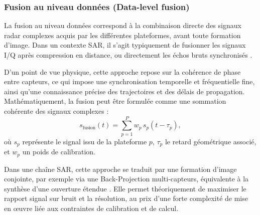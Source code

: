 \subsubsection{Fusion au niveau données (Data-level fusion)}

La fusion au niveau données correspond à la combinaison directe des signaux radar complexes acquis par les différentes plateformes, avant toute formation d’image.  
Dans un contexte SAR, il s’agit typiquement de fusionner les signaux I/Q après compression en distance, ou directement les échos bruts synchronisés \cite{richards2014}.

D’un point de vue physique, cette approche repose sur la cohérence de phase entre capteurs, ce qui impose une synchronisation temporelle et fréquentielle fine, ainsi qu’une connaissance précise des trajectoires et des délais de propagation.  
Mathématiquement, la fusion peut être formulée comme une sommation cohérente des signaux complexes :
\begin{equation}
s_{\text{fusion}}(t) = \sum_{p=1}^{P} w_p \, s_p(t - \tau_p),
\end{equation}
où $s_p$ représente le signal issu de la plateforme $p$, $\tau_p$ le retard géométrique associé, et $w_p$ un poids de calibration.

Dans une chaîne SAR, cette approche se traduit par une formation d’image conjointe, par exemple via une Back-Projection multi-capteurs, équivalente à la synthèse d’une ouverture étendue \cite{ender2010}.  
Elle permet théoriquement de maximiser le rapport signal sur bruit et la résolution, au prix d’une forte complexité de mise en œuvre liée aux contraintes de calibration et de calcul.



